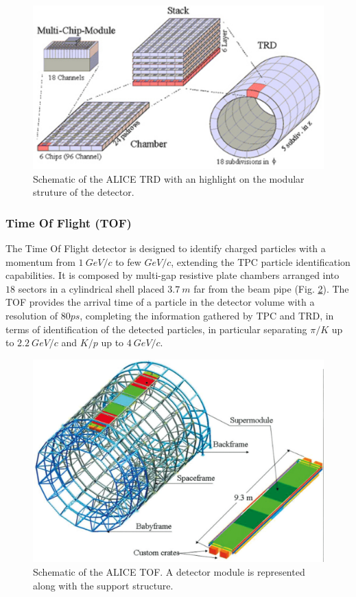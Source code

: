 \begin{figure}[!h]
\begin{center}
\includegraphics[width=0.7\linewidth]{Chapters/Introduction/Figs/trd.pdf}
\caption{Schematic of the ALICE TRD with an highlight on the modular struture of the detector.}
\label{fig:TRD}
\end{center}
\end{figure}

\subsubsection{Time Of Flight (TOF)}
The Time Of Flight detector is designed to identify charged particles with a momentum from $1\ GeV/c$ to few $GeV/c$, extending the TPC particle identification capabilities. 
It is composed by multi-gap resistive plate chambers arranged into $18$ sectors in a cylindrical shell placed $3.7\ m$ far from the beam pipe (Fig. \ref{fig:TOF}). 
The TOF provides the arrival time of a particle in the detector volume with a resolution of $80 ps$, completing the information gathered by TPC and TRD, in terms of identification of the detected particles, in particular separating $\pi/K$ up to $2.2\ GeV/c$ and $K/p$ up to $4\ GeV/c$.

\begin{figure}[!h]
\begin{center}
\includegraphics[width=0.7\linewidth]{Chapters/Introduction/Figs/tof.pdf}
\caption{Schematic of the ALICE TOF. A detector module is represented along with the support structure.}
\label{fig:TOF}
\end{center}
\end{figure}

